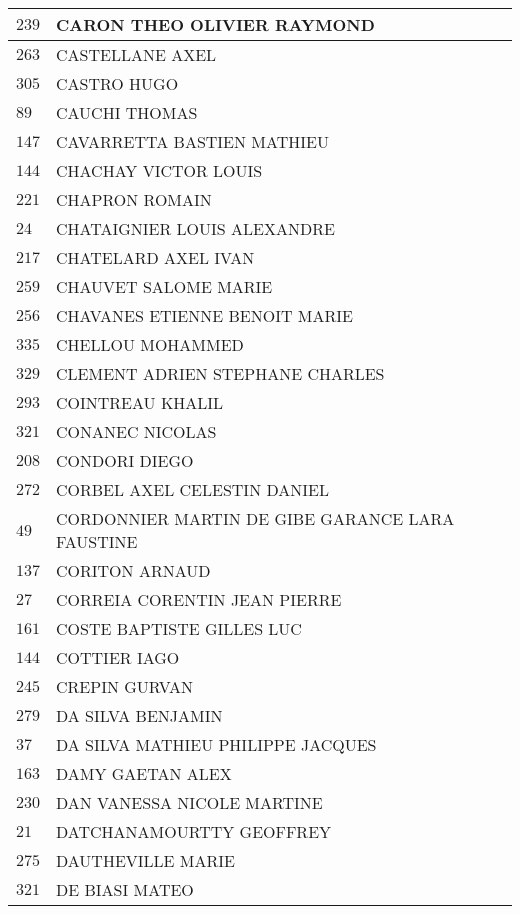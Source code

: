 \begin{xltabular}{\linewidth}{|l|X|}
    \hline
    $239$ & CARON THEO OLIVIER RAYMOND \\
    \hline
    $263$ & CASTELLANE AXEL \\
    \hline
    $305$ & CASTRO HUGO \\
    \hline
    $89$ & CAUCHI THOMAS \\
    \hline
    $147$ & CAVARRETTA BASTIEN MATHIEU \\
    \hline
    $144$ & CHACHAY VICTOR LOUIS \\
    \hline
    $221$ & CHAPRON ROMAIN \\
    \hline
    $24$ & CHATAIGNIER LOUIS ALEXANDRE \\
    \hline
    $217$ & CHATELARD AXEL IVAN \\
    \hline
    $259$ & CHAUVET SALOME MARIE \\
    \hline
    $256$ & CHAVANES ETIENNE BENOIT MARIE \\
    \hline
    $335$ & CHELLOU MOHAMMED \\
    \hline
    $329$ & CLEMENT ADRIEN STEPHANE CHARLES \\
    \hline
    $293$ & COINTREAU KHALIL \\
    \hline
    $321$ & CONANEC NICOLAS \\
    \hline
    $208$ & CONDORI DIEGO \\
    \hline
    $272$ & CORBEL AXEL CELESTIN DANIEL \\
    \hline
    $49$ & CORDONNIER MARTIN DE GIBE GARANCE LARA FAUSTINE \\
    \hline
    $137$ & CORITON ARNAUD \\
    \hline
    $27$ & CORREIA CORENTIN JEAN PIERRE \\
    \hline
    $161$ & COSTE BAPTISTE GILLES LUC \\
    \hline
    $144$ & COTTIER IAGO \\
    \hline
    $245$ & CREPIN GURVAN \\
    \hline
    $279$ & DA SILVA BENJAMIN \\
    \hline
    $37$ & DA SILVA MATHIEU PHILIPPE JACQUES \\
    \hline
    $163$ & DAMY GAETAN ALEX \\
    \hline
    $230$ & DAN VANESSA NICOLE MARTINE \\
    \hline
    $21$ & DATCHANAMOURTTY GEOFFREY \\
    \hline
    $275$ & DAUTHEVILLE MARIE \\
    \hline
    $321$ & DE BIASI MATEO \\

\end{xltabular}
